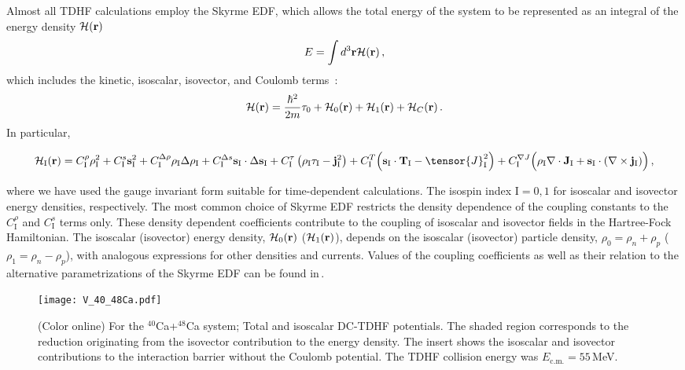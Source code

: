 \documentclass[aps,prl,twocolumn,superscriptaddress,floatfix,10pt]{revtex4-1}
\begin{document}
Almost all TDHF calculations employ the Skyrme EDF, which allows the total energy of the system to be represented
as an integral of the energy density ${\cal H}(\mathbf{r})$\,\cite{engel1975}
\begin{equation}
\label{eq:energy}
E = \int d^3\mathbf{r} {\cal H}(\mathbf{r})\,,
\end{equation}
which includes the kinetic,
isoscalar, isovector, and Coulomb terms \,\cite{dobaczewski1995}:
\begin{equation}
\label{eq:edensity}
{\cal H}(\mathbf{r}) = \frac{\hbar^2}{2m}\tau_0
+ {\cal H}_0(\mathbf{r})
+ {\cal H}_1(\mathbf{r})
+ {\cal H}_C(\mathbf{r})\,.
\end{equation}
In particular,
\begin{widetext}
\begin{equation}
\label{eq:efunctional}
{\cal H}_\mathrm{I}(\mathbf{r})
= C_\mathrm{I}^{\rho}            \rho_\mathrm{I}^2
+  C_\mathrm{I}^{   s}            \mathbf{s}_\mathrm{I}^2
+  C_\mathrm{I}^{\Delta\rho}      \rho_\mathrm{I}\Delta\rho_\mathrm{I}
+  C_\mathrm{I}^{\Delta s}        \mathbf{s}_\mathrm{I}\cdot\Delta\mathbf{s}_\mathrm{I}
+  C_\mathrm{I}^{\tau}      \left(\rho_\mathrm{I}\tau_\mathrm{I}-\mathbf{j}_\mathrm{I}^2  \right)
+  C_\mathrm{I}^{   T}      \Big(\mathbf{s}_\mathrm{I}\cdot
\mathbf{T}_\mathrm{I} - \tensor{J}_\mathrm{I}^2\Big)
+ C_\mathrm{I}^{\nabla J}  \Big(\rho_\mathrm{I}\mathbf{\nabla}\cdot\mathbf{J}_\mathrm{I}
+ \mathbf{s}_\mathrm{I}\cdot
(\mathbf{\nabla}\times\mathbf{j}_\mathrm{I})\Big)\,,
\end{equation}
\end{widetext}
where we have used the gauge invariant form suitable for time-dependent calculations.
The isospin index $\mathrm{I}=0,1$ for isoscalar and isovector energy densities, respectively.
The most common choice of Skyrme EDF restricts the density dependence of the
coupling constants to the $C_\mathrm{I}^{\rho}$ and $C_\mathrm{I}^s$ terms only.
These density dependent coefficients contribute to the coupling of isoscalar and isovector fields
in the Hartree-Fock Hamiltonian.
The isoscalar (isovector) energy density, ${\cal H}_0(\mathbf{r})$ (${\cal H}_1(\mathbf{r})$), depends on the isoscalar (isovector) particle
density, $\rho_0 = \rho_n + \rho_p$ ($\rho_1 = \rho_n - \rho_p$), with analogous expressions for other densities and
currents.
Values of the coupling
coefficients as well as their relation to the alternative parametrizations of the Skyrme
EDF can be found in\,\cite{dobaczewski1995}.
\begin{figure}[!htb]
\texttt{[image: V\_40\_48Ca.pdf]}
\caption{(Color online) For the $^{40}$Ca+$^{48}$Ca system;
	Total and isoscalar DC-TDHF potentials. The shaded region
	corresponds to the reduction originating from the isovector contribution to the energy
	density. The insert shows the isoscalar and isovector contributions to the interaction barrier
	without the Coulomb potential.
    The TDHF collision energy was $E_\mathrm{c.m.}=55$\,MeV.}
\label{fig:CaCa}
\end{figure}
\end{document}
